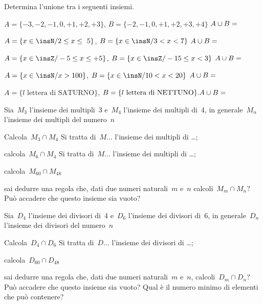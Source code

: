 \begin{esercizio}
\label{ese:7.45}
Determina l'unione tra i seguenti insiemi.

\begin{enumeratea}
 \item $A=\{-3,-2,-1,0,+1,+2,+3\}$, $B=\{-2,-1,0,+1,+2,+3,+4\}$ $A\cup 
B=\dotfill$
 \item $A=\{x\in\insN/2\le x\le~5\}$, $B=\{x\in\insN/3<x<7\}$ $A\cup B=\dotfill$
 \item $A=\{x\in\insZ/-5\le x\le +5\}$, $B=\{x\in\insZ/-15\le x<3\}$ $A\cup 
B=\dotfill$
 \item $A=\{x\in\insN/x>100\}$, $B=\{x\in \insN/10<x<20\}$ $A\cup B=\dotfill$
 \item $A=\{l\text{ lettera di SATURNO}\}$, $B=\{l\text{ lettera di NETTUNO}\}. 
A\cup B=\dotfill$
\end{enumeratea}
\end{esercizio}

\begin{esercizio}
\label{ese:7.46}
Sia~$M_{3}$ l'insieme dei multipli~3 e~$M_{4}$ l'insieme dei multipli di~4, in
generale~$M_{n}$ l'insieme dei multipli del numero~$n$

 \begin{enumeratea}
 \item Calcola~$M_{3}\cap M_{4}$ Si tratta di~$M\ldots$ l'insieme dei multipli 
di \ldots;
 \item calcola~$M_{6}\cap M_{4}$ Si tratta di~$M\ldots$ l'insieme dei multipli 
di \ldots;
 \item calcola~$M_{60}\cap M_{48}$
 \item sai dedurre una regola che, dati due numeri naturali~$m$ e~$n$ 
calcoli~$M_{m}\cap M_{n}$? Può accadere che questo insieme sia vuoto?
 \end{enumeratea}
\end{esercizio}


\begin{esercizio}
\label{ese:7.47}
Sia~$D_{4}$ l'insieme dei divisori di~4 e~$D_{6}$ l'insieme dei divisori di~6, 
in
generale~$D_{n}$ l'insieme dei divisori del numero~$n$

\begin{enumeratea}
 \item Calcola~$D_{4}\cap D_{6}$ Si tratta di~$D\ldots$ l'insieme dei divisori 
di \ldots;
 \item calcola~$D_{60}\cap D_{48}$
 \item sai dedurre una regola che, dati due numeri naturali~$m$ e~$n$,
calcoli~$D_{m}\cap D_{n}$? Può accadere che questo insieme sia
vuoto? Qual è il numero minimo di elementi che può contenere?
\end{enumeratea}
\end{esercizio}

